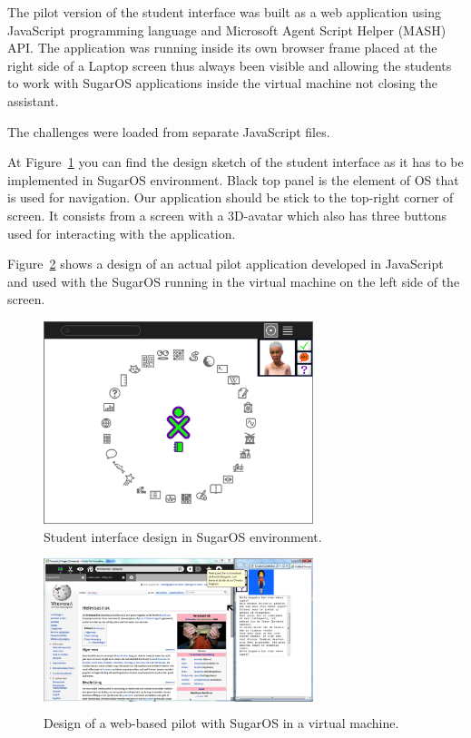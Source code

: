 \documentclass[a4paper]{article}
\begin{document}
The pilot version of the student interface was built as a web application using JavaScript programming language and Microsoft Agent Script Helper (MASH) API. The application was running inside its own browser frame placed at the right side of a Laptop screen thus always been visible and allowing the students to work with SugarOS applications inside the virtual machine not closing the assistant.

The challenges were loaded from separate JavaScript files.

At Figure~\ref{fig:intended-design} you can find the design sketch of the student interface as it has to be implemented in SugarOS environment. Black top panel is the element of OS that is used for navigation. Our application should be stick to the top-right corner of screen. It consists from a screen with a 3D-avatar which also has three buttons used for interacting with the application. 

Figure~\ref{fig:pilot-design} shows a design of an actual pilot application developed in JavaScript and used with the SugarOS running in the virtual machine on the left side of the screen. 

\begin{figure}[ht]
\begin{center}
\includegraphics[width=0.7\textwidth]{intended-design.png}
\caption{Student interface design in SugarOS environment.}
\label{fig:intended-design}
\end{center}
\end{figure}

\begin{figure}[ht]
\begin{center}
\includegraphics[width=0.7\textwidth]{pilot-design.png}
\caption{Design of a web-based pilot with SugarOS in a virtual machine.}
\label{fig:pilot-design}
\end{center}
\end{figure}
\end{document}
